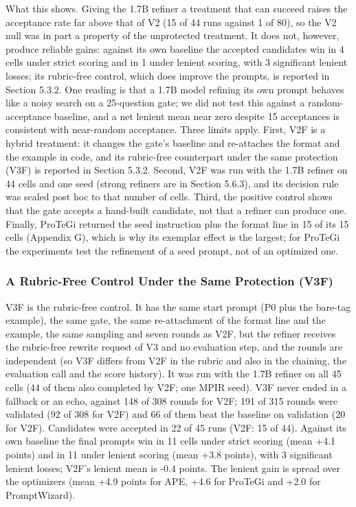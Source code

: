 \documentclass{ieeeaccess}
\begin{document}
What this shows. Giving the 1.7B refiner a treatment that can succeed raises the acceptance rate far above that of V2 (15 of 44 runs against 1 of 80), so the V2 null was in part a property of the unprotected treatment. It does not, however, produce reliable gains: against its own baseline the accepted candidates win in 4 cells under strict scoring and in 1 under lenient scoring, with 3 significant lenient losses; its rubric-free control, which does improve the prompts, is reported in Section 5.3.2. One reading is that a 1.7B model refining its own prompt behaves like a noisy search on a 25-question gate; we did not test this against a random-acceptance baseline, and a net lenient mean near zero despite 15 acceptances is consistent with near-random acceptance. Three limits apply. First, V2F is a hybrid treatment: it changes the gate's baseline and re-attaches the format and the example in code, and its rubric-free counterpart under the same protection (V3F) is reported in Section 5.3.2. Second, V2F was run with the 1.7B refiner on 44 cells and one seed (strong refiners are in Section 5.6.3), and its decision rule was scaled post hoc to that number of cells. Third, the positive control shows that the gate accepts a hand-built candidate, not that a refiner can produce one. Finally, ProTeGi returned the seed instruction plus the format line in 15 of its 15 cells (Appendix G), which is why its exemplar effect is the largest; for ProTeGi the experiments test the refinement of a seed prompt, not of an optimized one.

\subsubsection{A Rubric-Free Control Under the Same Protection (V3F)}

V3F is the rubric-free control. It has the same start prompt (P0 plus the bare-tag example), the same gate, the same re-attachment of the format line and the example, the same sampling and seven rounds as V2F, but the refiner receives the rubric-free rewrite request of V3 and no evaluation step, and the rounds are independent (so V3F differs from V2F in the rubric and also in the chaining, the evaluation call and the score history). It was run with the 1.7B refiner on all 45 cells (44 of them also completed by V2F; one MPIR seed). V3F never ended in a fallback or an echo, against 148 of 308 rounds for V2F; 191 of 315 rounds were validated (92 of 308 for V2F) and 66 of them beat the baseline on validation (20 for V2F). Candidates were accepted in 22 of 45 runs (V2F: 15 of 44). Against its own baseline the final prompts win in 11 cells under strict scoring (mean +4.1 points) and in 11 under lenient scoring (mean +3.8 points), with 3 significant lenient losses; V2F's lenient mean is -0.4 points. The lenient gain is spread over the optimizers (mean +4.9 points for APE, +4.6 for ProTeGi and +2.0 for PromptWizard).
\end{document}
